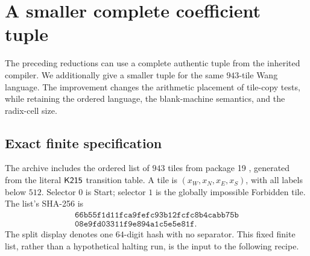 \section{A smaller complete coefficient tuple}
\label{sec:coefficients}

The preceding reductions can use a complete authentic tuple from
the inherited compiler. We additionally give a smaller tuple for
the same \(943\)-tile Wang language.
The improvement changes the arithmetic placement of tile-copy
tests, while retaining the ordered language, the blank-machine
semantics, and the radix-cell size.

\subsection{Exact finite specification}

The archive includes the ordered list of \(943\) tiles from
package 19 \cite{wang}, generated from the literal \(\mathsf{K215}\)
transition table. A tile is
\((x_W,x_N,x_E,x_S)\), with all labels below \(512\).
Selector \(0\) is Start; selector \(1\) is the globally impossible
Forbidden tile. The list's SHA-256 is
\[
\begin{gathered}
\texttt{66b55f1d11fca9fefc93b12fcfc8b4cabb75b}\\
\texttt{08e9fd03311f9e894a1c5e5e81f}.
\end{gathered}
\]
The split display denotes one \(64\)-digit hash with no separator.
This fixed finite list, rather than a hypothetical halting run,
is the input to the following recipe.

